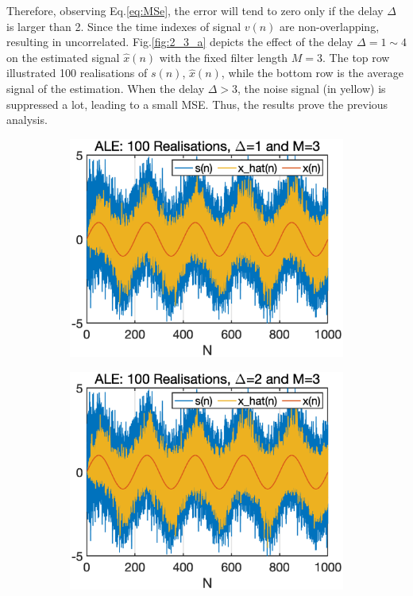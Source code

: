 Therefore, observing Eq.\ref{eq:MSe}, the error will tend to zero only if the delay $\Delta$ is larger than 2. Since the time indexes of signal $v(n)$  are non-overlapping, resulting in uncorrelated. Fig.\ref{fig:2_3_a} depicts the effect of the delay $\Delta=1\sim4$ on the estimated signal $\hat x(n)$ with the fixed filter length $M=3$. The top row illustrated 100 realisations of $s(n)$, $\hat x(n)$, while the bottom row is the average signal of the estimation. When the delay $\Delta>3$, the noise signal (in yellow) is suppressed a lot, leading to a small MSE. Thus, the results prove the previous analysis.
\begin{figure}[htb]
    \centering
    \hspace{-0.4cm}
    \begin{subfigure}[b]{0.26\textwidth}
     \centering
     \includegraphics[width=\textwidth]{fig/23/23a1.eps}
    \end{subfigure}
    \hspace{-0.4cm}
    \begin{subfigure}[b]{0.26\textwidth}
     \centering
     \includegraphics[width=\textwidth]{fig/23/23a3.eps}

\end{subfigure}
\end{figure}
